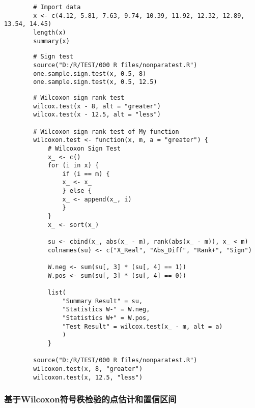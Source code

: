 \documentclass[UTF8]{ctexart}
\numberwithin{equation}{section}
\begin{document}
\begin{center}
    \begin{lstlisting}
        # Import data
        x <- c(4.12, 5.81, 7.63, 9.74, 10.39, 11.92, 12.32, 12.89, 13.54, 14.45)
        length(x)
        summary(x)
    \end{lstlisting}
\end{center}

\begin{center}
    \begin{lstlisting}
        # Sign test
        source("D:/R/TEST/000 R files/nonparatest.R")
        one.sample.sign.test(x, 0.5, 8)
        one.sample.sign.test(x, 0.5, 12.5)
    \end{lstlisting}
\end{center}

\begin{center}
    \begin{lstlisting}
        # Wilcoxon sign rank test
        wilcox.test(x - 8, alt = "greater")
        wilcox.test(x - 12.5, alt = "less")

        # Wilcoxon sign rank test of My function
        wilcoxon.test <- function(x, m, a = "greater") {
            # Wilcoxon Sign Test
            x_ <- c()
            for (i in x) {
                if (i == m) {
                x_ <- x_
                } else {
                x_ <- append(x_, i)
                }
            }
            x_ <- sort(x_)

            su <- cbind(x_, abs(x_ - m), rank(abs(x_ - m)), x_ < m)
            colnames(su) <- c("X_Real", "Abs_Diff", "Rank+", "Sign")

            W.neg <- sum(su[, 3] * (su[, 4] == 1))
            W.pos <- sum(su[, 3] * (su[, 4] == 0))

            list(
                "Summary Result" = su,
                "Statistics W-" = W.neg,
                "Statistics W+" = W.pos,
                "Test Result" = wilcox.test(x_ - m, alt = a)
                )
            }

        source("D:/R/TEST/000 R files/nonparatest.R")
        wilcoxon.test(x, 8, "greater")
        wilcoxon.test(x, 12.5, "less")
    \end{lstlisting}
\end{center}

\subsubsection{基于Wilcoxon符号秩检验的点估计和置信区间}
\end{document}
